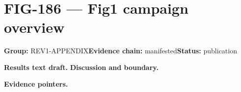 \clearpage
\section{FIG-186 --- Fig1 campaign overview}
\label{figpage:fig-186}
\textbf{Group:} REV1-APPENDIX\quad \textbf{Evidence chain:} manifested\quad \textbf{Status:} publication

\textbf{Results text draft.} 
\textbf{Discussion and boundary.} 


\textbf{Evidence pointers.}



\vfill
